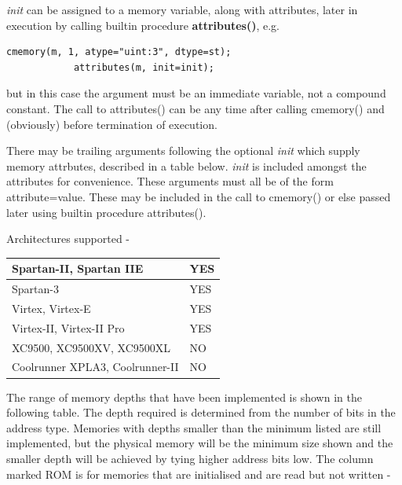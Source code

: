         {\em init} can be assigned to a memory
        variable, along with attributes, later in execution by calling
        builtin procedure {\bf attributes()}, e.g.
        \begin{lstlisting}[gobble=8, language=threepl]
            cmemory(m, 1, atype="uint:3", dtype=st);
            attributes(m, init=init);
        \end{lstlisting}
        but in this case the argument must be an immediate variable, not a compound
        constant. The call to attributes() can be any time after calling
        cmemory() and (obviously) before termination of execution.

        There may be trailing arguments following the optional {\em init} which supply
        memory attrbutes, described in a table below. {\em init} is included amongst
        the attributes for convenience. These arguments must all be of the form
        attribute=value. These may be included in the call to cmemory() or else passed
        later using builtin procedure attributes().

        

        Architectures supported -

        \begin{tabular}{| l | l |} \hline
        Spartan-II, Spartan IIE         & YES   \\ \hline
        Spartan-3                       & YES   \\ \hline
        Virtex, Virtex-E                & YES   \\ \hline
        Virtex-II, Virtex-II Pro        & YES   \\ \hline
        XC9500, XC9500XV, XC9500XL      & NO    \\ \hline
        Coolrunner XPLA3, Coolrunner-II & NO    \\ \hline
        \end{tabular}

        The range of memory depths that have been implemented is shown in the
        following table. The depth required is determined from the number of bits
        in the address type. Memories with depths smaller than the minimum listed
        are still implemented, but the physical memory will be the minimum size
        shown and the smaller depth will be achieved by tying higher address bits
        low. The column marked ROM is for memories that are initialised and are
        read but not written -

